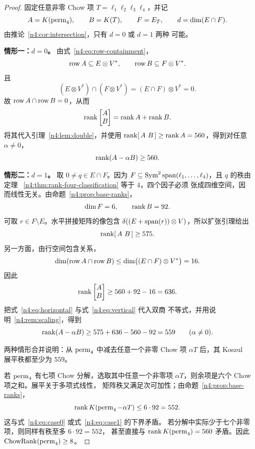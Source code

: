 \begin{proof}
固定任意非零 Chow 项 \(T=\ell_1\ell_2\ell_3\ell_4\)，并记
\[
  A=K(\operatorname{perm}_4),\qquad B=K(T),\qquad
  F=E_T,\qquad d=\dim(E\cap F).
\]
由推论~\ref{n4:cor:intersection}，只有 \(d=0\) 或 \(d=1\) 两种
可能。

\medskip
\noindent\textbf{情形一：\(d=0\)。}
由式~\eqref{n4:eq:row-containment}，
\[
  \operatorname{row} A\subseteq E\otimes V^*,\qquad
  \operatorname{row} B\subseteq F\otimes V^*.
\]
且
\[
  (E\otimes V^*)\cap(F\otimes V^*)
  =(E\cap F)\otimes V^*=0.
\]
故 \(\operatorname{row} A\cap\operatorname{row} B=0\)，从而
\[
  \operatorname{rank}\begin{bmatrix}A\\B\end{bmatrix}
  =\operatorname{rank} A+\operatorname{rank} B.
\]
将其代入引理~\ref{n4:lem:double}，并使用
\(\operatorname{rank}[\,A\ B\,]\geq\operatorname{rank} A=560\)，得到对任意
\(\alpha\neq0\)，
\begin{equation}\label{n4:eq:case0}
  \operatorname{rank}(A-\alpha B)\geq560.
\end{equation}

\medskip
\noindent\textbf{情形二：\(d=1\)。}
取 \(0\neq q\in E\cap F\)。因为 \(F\subseteq
\operatorname{Sym}^2\operatorname{span}(\ell_1,\ldots,\ell_4)\)，且 \(q\) 的秩由定理
~\ref{n4:thm:rank-four-classification} 等于 \(4\)，四个因子必须
张成四维空间，因而线性无关。由命题~\ref{n4:prop:base-ranks}，
\[
  \dim F=6,\qquad \operatorname{rank} B=92.
\]
可取 \(r\in F\setminus E\)。水平拼接矩阵的像包含
\(\delta((E+\operatorname{span}(r))\otimes V)\)，所以扩张引理给出
\begin{equation}\label{n4:eq:horizontal}
  \operatorname{rank}[\,A\ B\,]\geq575.
\end{equation}
另一方面，由行空间包含关系，
\[
  \dim(\operatorname{row} A\cap\operatorname{row} B)
  \leq\dim\bigl((E\cap F)\otimes V^*\bigr)=16.
\]
因此
\begin{equation}\label{n4:eq:vertical}
  \operatorname{rank}\begin{bmatrix}A\\B\end{bmatrix}
  \geq560+92-16=636.
\end{equation}
把式~\eqref{n4:eq:horizontal} 与式~\eqref{n4:eq:vertical} 代入双商
不等式，并用说明~\ref{n4:rem:scaling}，得到
\begin{equation}\label{n4:eq:case1}
  \operatorname{rank}(A-\alpha B)
  \geq575+636-560-92=559
  \qquad(\alpha\neq0).
\end{equation}

两种情形合并说明：从 \(\operatorname{perm}_4\) 中减去任意一个非零 Chow 项
\(\alpha T\) 后，其 Koszul 展平秩都至少为 \(559\)。

若 \(\operatorname{perm}_4\) 有七项 Chow 分解，选取其中任意一个非零项
\(\alpha T\)，则余项是六个 Chow 项之和。展平关于多项式线性，
矩阵秩又满足次可加性；由命题~\ref{n4:prop:base-ranks}，
\[
  \operatorname{rank} K(\operatorname{perm}_4-\alpha T)
  \leq6\cdot92=552.
\]
这与式~\eqref{n4:eq:case0} 或式~\eqref{n4:eq:case1} 的下界矛盾。
若分解中实际少于七个非零项，则同样有秩至多 \(6\cdot92=552\)，
甚至直接与 \(\operatorname{rank} K(\operatorname{perm}_4)=560\) 矛盾。因此
\(\operatorname{ChowRank}(\operatorname{perm}_4)\geq8\)。
\end{proof}


